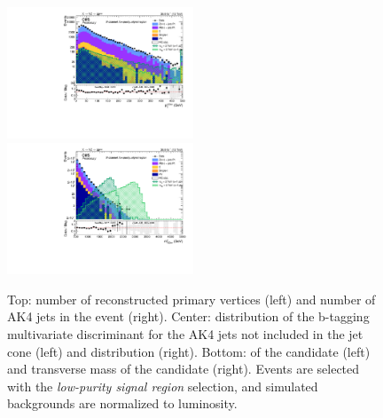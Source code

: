 \begin{figure}[!htb]
\begin{center}
    \includegraphics[width=0.495\textwidth]{plots/v9_U/XVZnnlpSR/X_pt.pdf}
    \includegraphics[width=0.495\textwidth]{plots/v9_U/XVZnnlpSR/X_tmass.pdf}

    \caption{Top: number of reconstructed primary vertices (left) and number of AK4 jets in the event (right). Center: distribution of the b-tagging multivariate discriminant for the AK4 jets not included in the \V jet cone (left) and \MET distribution (right). Bottom: \pt of the \VZ candidate (left) and transverse mass of the \VZ candidate (right). Events are selected with the \emph{low-purity signal region} selection, and simulated backgrounds are normalized to luminosity.}
  \end{center}
\end{figure}

\clearpage


